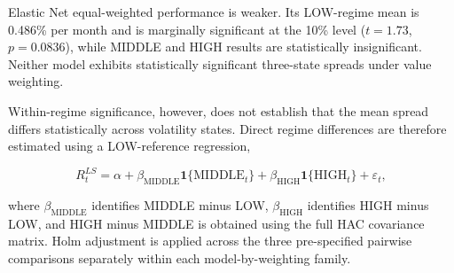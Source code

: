 Elastic Net equal-weighted performance is weaker. Its LOW-regime mean is 0.486\% per month and is marginally significant at the 10\% level ($t=1.73$, $p=0.0836$), while MIDDLE and HIGH results are statistically insignificant. Neither model exhibits statistically significant three-state spreads under value weighting.

Within-regime significance, however, does not establish that the mean spread differs statistically across volatility states. Direct regime differences are therefore estimated using a LOW-reference regression,

\begin{equation}
R^{LS}_t
=
\alpha
+
\beta_{\mathrm{MIDDLE}}
\mathbf{1}\{\mathrm{MIDDLE}_t\}
+
\beta_{\mathrm{HIGH}}
\mathbf{1}\{\mathrm{HIGH}_t\}
+
\varepsilon_t,
\end{equation}

where $\beta_{\mathrm{MIDDLE}}$ identifies MIDDLE minus LOW, $\beta_{\mathrm{HIGH}}$ identifies HIGH minus LOW, and HIGH minus MIDDLE is obtained using the full HAC covariance matrix. Holm adjustment is applied across the three pre-specified pairwise comparisons separately within each model-by-weighting family.

